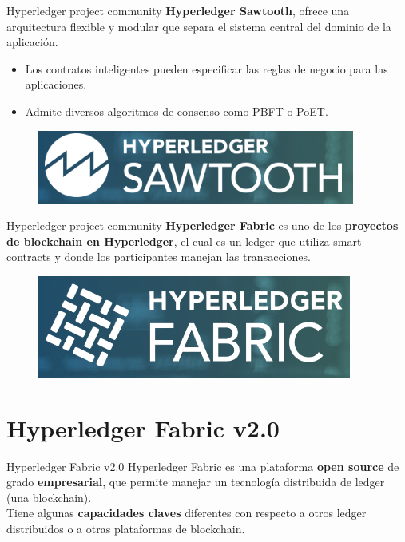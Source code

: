 \documentclass{beamer}
\begin{document}
	\begin{frame}
		\begin{block}{Hyperledger project community}
			\textbf{Hyperledger Sawtooth}, ofrece una arquitectura flexible y modular que separa el sistema central del dominio de la aplicación.
			\begin{itemize}
				\item Los contratos inteligentes pueden especificar las reglas de negocio para las aplicaciones.
				\item Admite diversos algoritmos de consenso como PBFT o PoET.
			\end{itemize}
			\begin{figure}[h]
				\includegraphics[scale=.3]{sawtooth_logo}
				\centering
			\end{figure}
		\end{block}
	\end{frame}

	\begin{frame}
		\begin{block}{Hyperledger project community}
			\textbf{Hyperledger Fabric} es uno de los \textbf{proyectos de blockchain en Hyperledger}, el cual es un ledger que utiliza smart contracts y donde los participantes manejan las transacciones.
			\begin{figure}[h]
				\includegraphics[scale=.3]{fabric_logo}
				\centering
			\end{figure}
		\end{block}
	\end{frame}
	
	\section{Hyperledger Fabric v2.0}
	
	\begin{frame}
		\begin{block}{Hyperledger Fabric v2.0}
			Hyperledger Fabric es una plataforma \textbf{open source} de grado \textbf{empresarial}, que permite manejar un tecnología distribuida de ledger (una blockchain).\\
			\vspace{4mm}
			Tiene algunas \textbf{capacidades claves} diferentes con respecto a otros ledger distribuidos o a otras plataformas de blockchain.
		\end{block}
	\end{frame}
\end{document}
